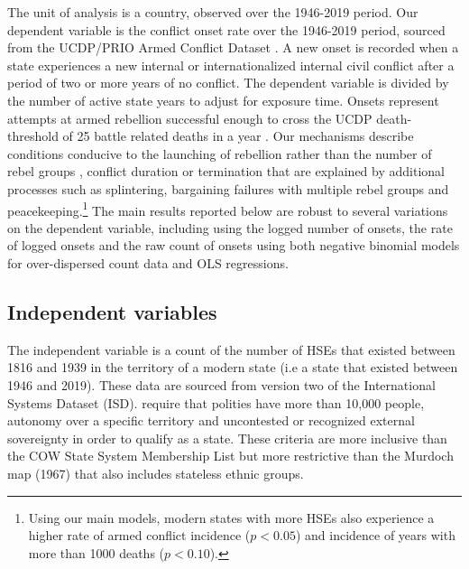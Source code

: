 The unit of analysis is a country, observed over the 1946-2019 period. Our
dependent variable is the conflict onset rate over the 1946-2019 period, sourced from the UCDP/PRIO Armed Conflict
Dataset \citep{Pettersson2020}. A new onset is recorded when a state experiences
a new internal or internationalized internal civil conflict after a period of
two or more years of no conflict. The dependent variable is divided by the number of active state years to adjust for exposure time. Onsets represent
attempts at armed rebellion successful enough to cross the UCDP death-threshold
of 25 battle related deaths in a year \citep{Tollefsen2012,
Lewis2017}.  Our mechanisms
describe conditions conducive to the launching of rebellion rather than the
number of rebel groups \citep{Fjelde2009}, conflict duration
\citep{Cunningham2006} or termination \citep{Walter2004} that are explained by
additional processes such as splintering, bargaining failures with multiple
rebel groups and peacekeeping.\footnote{Using our main models, modern states with more HSEs also experience a higher rate of armed conflict incidence ($p<0.05$) and incidence of years with more than 1000 deaths ($p<0.10$).} 
The main results reported below are robust to several variations on the dependent variable, including using the logged number of onsets, the rate of logged onsets and the raw count of onsets using both negative binomial models for over-dispersed count data and OLS regressions. 

\subsection{Independent variables}
    
The independent variable is a count of the number of HSEs that existed between
1816 and 1939 in the territory of a modern state (i.e a state that existed
between 1946 and 2019). These data are sourced from version two of the
International Systems Dataset (ISD). \cite{Butcher2020}
require that polities have more than 10,000 people, autonomy over a specific
territory and uncontested or recognized external sovereignty in order to qualify
as a state. These criteria are more inclusive
than the COW State System Membership List \citep{Sarkees2010} but more
restrictive than the Murdoch map (1967) that also includes stateless ethnic
groups. 

